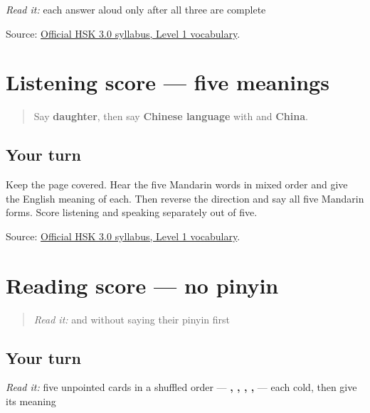 \emph{Read it:} each answer aloud only after all three are complete

\begin{tcolorbox}[breakable,colback=teal!4,colframe=teal!35!black,title={Before you move on}]
Source: \href{https://hsk.cn-bj.ufileos.com/3.0/\%E6\%96\%B0\%E7\%89\%88HSK\%E8\%80\%83\%E8\%AF\%95\%E5\%A4\%A7\%E7\%BA\%B21219.pdf}{Official HSK 3.0 syllabus, Level 1 vocabulary}.
\end{tcolorbox}
\section[Practice]{Listening score — five meanings}

\label{lesson:ZH-R17-listening-five}



\begin{quote}
Say \textbf{daughter}, then say \textbf{Chinese language} with  and \textbf{China}.
\end{quote}

\subsection*{Your turn}
Keep the page covered. Hear the five Mandarin words in mixed order and give the English meaning of each. Then reverse the direction and say all five Mandarin forms. Score listening and speaking separately out of five.

\begin{tcolorbox}[breakable,colback=teal!4,colframe=teal!35!black,title={Before you move on}]
Source: \href{https://hsk.cn-bj.ufileos.com/3.0/\%E6\%96\%B0\%E7\%89\%88HSK\%E8\%80\%83\%E8\%AF\%95\%E5\%A4\%A7\%E7\%BA\%B21219.pdf}{Official HSK 3.0 syllabus, Level 1 vocabulary}.
\end{tcolorbox}
\section[Practice]{Reading score — no pinyin}

\label{lesson:ZH-R17-reading-five}



\begin{quote}
\emph{Read it:} \textbf{} and \textbf{} without saying their pinyin first
\end{quote}

\subsection*{Your turn}
\emph{Read it:} five unpointed cards in a shuffled order — \textbf{, , , , } — each cold, then give its meaning

